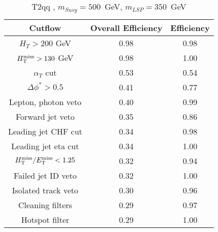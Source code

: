 \begin{longtable}{| c | c | c  | }
\caption{T2qq , $m_{Susy} = 500 $~GeV, $m_{LSP} = 350$~GeV} \label{tab: T2qq  500  350 } \\    \hline 
\textbf{Cutflow} & \textbf{Overall Efficiency} & \textbf{Efficiency}\\ \hline 
$H_{T} > 200$ GeV & 0.98 & 0.98\\ \hline 
$H_{\rm T}^{\rm miss} > 130$ GeV & 0.98 & 1.00\\ \hline 
$\alpha_{T}$ cut & 0.53 & 0.54\\ \hline 
$\Delta\phi^{*} > 0.5$ & 0.41 & 0.77\\ \hline 
Lepton, photon veto & 0.40 & 0.99\\ \hline 
Forward jet veto & 0.35 & 0.86\\ \hline 
Leading jet CHF cut & 0.34 & 0.98\\ \hline 
Leading jet eta cut & 0.34 & 1.00\\ \hline 
$H_{\rm T}^{\rm miss} / E_{\rm T}^{\rm miss} < 1.25$ & 0.32 & 0.94\\ \hline 
Failed jet ID veto & 0.32 & 1.00\\ \hline 
Isolated track veto & 0.30 & 0.96\\ \hline 
Cleaning filters & 0.29 & 0.97\\ \hline 
Hotspot filter & 0.29 & 1.00\\ \hline 
    \hline 
    \hline 
\end{longtable}
